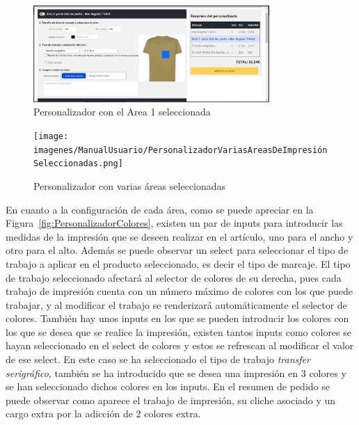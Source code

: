 \documentclass[11pt]{article}
\begin{document}
\begin{figure}[H]
    \centering
    \includegraphics[width=0.8\textwidth]{imagenes/ManualUsuario/PersonalizadorArea1Seleccionada.png}
    \caption{\label{fig:PersonalizadorAreaMarcada}Personalizador con el Area 1 seleccionada}
    \vspace{\fill}
\end{figure}

\begin{figure}[H]
    \centering
    \texttt{[image: imagenes/ManualUsuario/PersonalizadorVariasAreasDeImpresiónSeleccionadas.png]}
    \caption{\label{fig:PersonalizadorVariasAreas}Personalizador con varias áreas seleccionadas}
    \vspace{\fill}
\end{figure}

En cuanto a la configuración de cada área, como se puede apreciar en la Figura~\ref{fig:PersonalizadorColores}, existen un par de inputs para introducir las medidas de la impresión que se deseen 
realizar en el artículo, uno para el ancho y otro para el alto. Además se puede observar un select para seleccionar el tipo de trabajo a aplicar en el producto seleccionado, es decir el tipo de marcaje. El tipo de trabajo seleccionado
afectará al selector de colores de su derecha, pues cada trabajo de impresión cuenta con un número máximo de colores con los que puede trabajar, y al modificar el trabajo se renderizará automáticamente el selector de colores.
También hay unos inputs en los que se pueden introducir los colores con los que se desea que se realice la impresión, existen tantos inputs como colores se hayan seleccionado en el select de colores y estos
se refrescan al modificar el valor de ese select. En este caso se ha seleccionado el tipo de trabajo \textit{transfer serigráfico}, también se ha introducido que se desea una impresión en 3 colores y se han seleccionado dichos colores en los inputs.
En el resumen de pedido se puede observar como aparece el trabajo de impresión, su cliche asociado y un cargo extra por la adicción de 2 colores extra.
\end{document}
